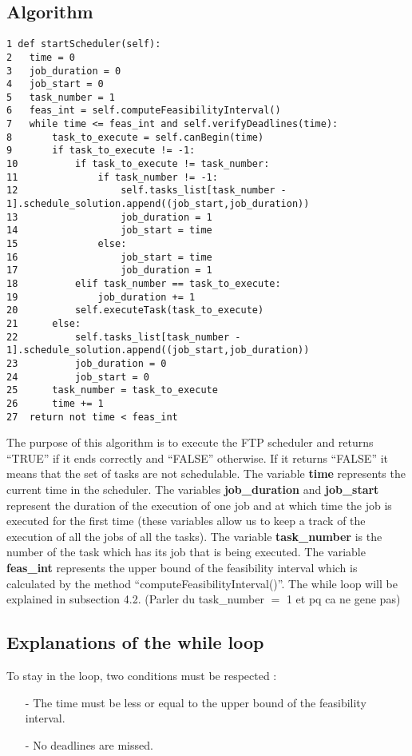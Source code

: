 \documentclass[a4paper,12pt]{article}
\begin{document}
\subsection{Algorithm}

\begin{lstlisting}
1 def startScheduler(self):
2	time = 0
3	job_duration = 0
4	job_start = 0 
5	task_number = 1
6	feas_int = self.computeFeasibilityInterval()
7	while time <= feas_int and self.verifyDeadlines(time):
8		task_to_execute = self.canBegin(time)
9		if task_to_execute != -1:
10			if task_to_execute != task_number:
11				if task_number != -1:
12					self.tasks_list[task_number - 1].schedule_solution.append((job_start,job_duration))
13					job_duration = 1
14					job_start = time
15				else:
16					job_start = time
17					job_duration = 1
18			elif task_number == task_to_execute:
19				job_duration += 1
20			self.executeTask(task_to_execute)
21		else:
22			self.tasks_list[task_number - 1].schedule_solution.append((job_start,job_duration))
23			job_duration = 0
24			job_start = 0 
25		task_number = task_to_execute
26		time += 1
27	return not time < feas_int
\end{lstlisting}

\smallskip
\noindent
The purpose of this algorithm is to execute the FTP scheduler and returns ``TRUE'' if it ends correctly and ``FALSE'' otherwise. If it returns ``FALSE'' it means that the set of tasks are not schedulable. The variable \textbf{time} represents the current time in the scheduler. The variables \textbf{job\_duration} and \textbf{job\_start} represent the duration of the execution of one job and at which time the job is executed for the first time (these variables allow us to keep a track of the execution of all the jobs of all the tasks). The variable \textbf{task\_number} is the number of the task which has its job that is being executed. The variable \textbf{feas\_int} represents the upper bound of the feasibility interval which is calculated by the method ``computeFeasibilityInterval()''. The while loop will be explained in subsection 4.2. (Parler du task\_number $=$ 1 et pq ca ne gene pas)
\newpage
\subsection{Explanations of the while loop}

To stay in the loop, two conditions must be respected : \\
\begin{itemize}
\item[-] The time must be less or equal to the upper bound of the feasibility interval.
\item[-] No deadlines are missed. 
\end{itemize}
\end{document}
